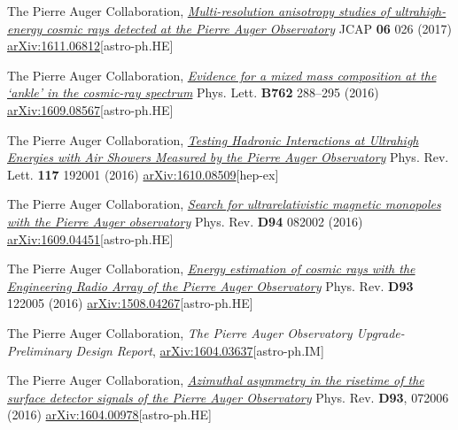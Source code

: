 \begin{etaremune}
\item {}The Pierre Auger Collaboration, \href{https://doi.org/10.1088/1475-7516/2017/06/026}{\emph{Multi-resolution anisotropy studies of ultrahigh-energy cosmic rays detected at the Pierre Auger Observatory}} JCAP {\bf 06} 026 (2017) \href{http://arxiv.org/abs/1611.06812}{arXiv:1611.06812}[astro-ph.HE]

\item {}The Pierre Auger Collaboration, \href{http://dx.doi.org/10.1016/j.physletb.2016.09.039}{\emph{Evidence for a mixed mass composition at the ‘ankle’ in the cosmic-ray spectrum}} Phys. Lett. {\bf B762} 288--295 (2016) \href{http://arxiv.org/abs/1609.08567}{arXiv:1609.08567}[astro-ph.HE]

\item {}The Pierre Auger Collaboration, \href{https://doi.org/10.1103/PhysRevLett.117.192001}{\emph{Testing Hadronic Interactions at Ultrahigh Energies with Air Showers Measured by the Pierre Auger Observatory}} Phys. Rev. Lett.  {\bf 117} 192001 (2016) \href{http://arxiv.org/abs/1610.08509}{arXiv:1610.08509}[hep-ex]

\item {}The Pierre Auger Collaboration, \href{https://doi.org/10.1103/PhysRevD.94.082002}{\emph{Search for ultrarelativistic magnetic monopoles with the Pierre Auger observatory}} Phys. Rev. {\bf D94} 082002 (2016) \href{http://arxiv.org/abs/1609.04451}{arXiv:1609.04451}[astro-ph.HE]

\item {}The Pierre Auger Collaboration, \href{https://doi.org/10.1103/PhysRevD.93.122005}{\emph{Energy estimation of cosmic rays with the Engineering Radio Array of the Pierre Auger Observatory}} Phys. Rev. {\bf D93} 122005 (2016) \href{http://arxiv.org/abs/1508.04267}{arXiv:1508.04267}[astro-ph.HE]

\item {} The Pierre Auger Collaboration, {\emph{The Pierre Auger Observatory Upgrade-Preliminary Design Report}}, \href{http://arxiv.org/abs/1604.03637}{arXiv:1604.03637}[astro-ph.IM]

\item {}The Pierre Auger Collaboration, \href{http://journals.aps.org/prd/abstract/10.1103/PhysRevD.93.072006}{\emph{Azimuthal asymmetry in the risetime of the surface detector signals of the Pierre Auger Observatory}} Phys. Rev. {\bf D93}, 072006 (2016) \href{http://arxiv.org/abs/1604.00978}{arXiv:1604.00978}[astro-ph.HE]


\end{etaremune}
